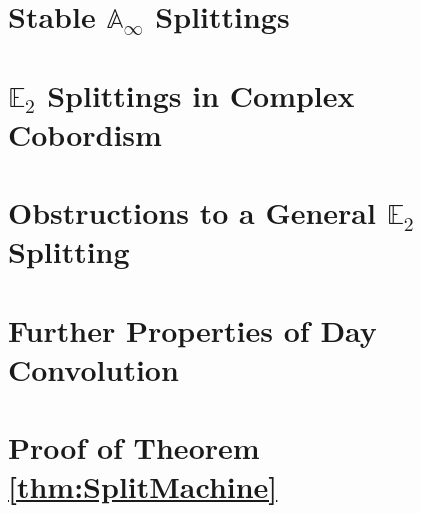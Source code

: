 \documentclass[reqno, oneside]{amsart}
\theoremstyle{definition}
\theoremstyle{plain}
\begin{document}
\section{Stable \texorpdfstring{$\mathbb{A}_\infty$}{Aoo} Splittings} \label{sec:AooSplit}



\section{\texorpdfstring{$\mathbb{E}_2$}{E2} Splittings in Complex Cobordism} \label{sec:MUE2}



\section{Obstructions to a General \texorpdfstring{$\mathbb{E}_2$}{E2} Splitting} \label{sec:Obstruction}



\appendix

\section{Further Properties of Day Convolution}\label{app:day}



\section{Proof of Theorem \ref{thm:SplitMachine}}\label{app:SplittingMachine}




%
\end{document}
